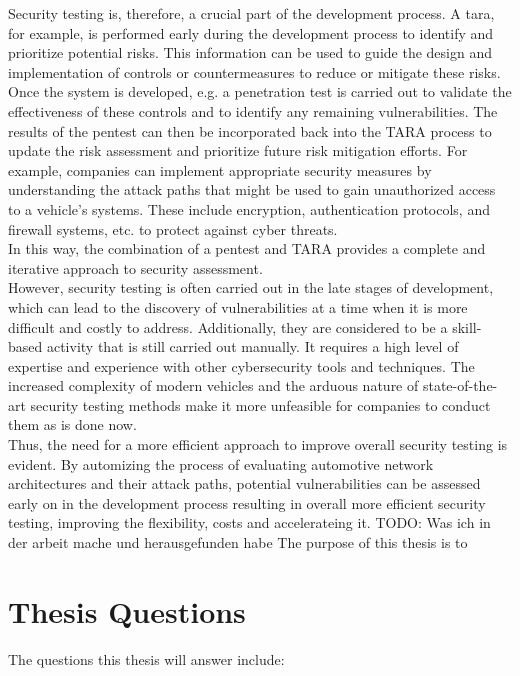 Security testing is, therefore, a crucial part of the development process.
A \gls{tara}, for example, is performed early during the development process to identify and prioritize potential risks.
This information can be used to guide the design and implementation of controls or countermeasures to reduce or mitigate these risks.
Once the system is developed, e.g. a penetration test is carried out to validate the effectiveness of these controls and to identify any remaining vulnerabilities. 
The results of the pentest can then be incorporated back into the TARA process to update the risk assessment and prioritize future risk mitigation efforts. 
For example, companies can implement appropriate security measures by understanding the attack paths that might be used to gain unauthorized access to a vehicle's systems. 
These include encryption, authentication protocols, and firewall systems, etc. to protect against cyber threats.\\
In this way, the combination of a pentest and TARA provides a complete and iterative approach to security assessment.\\
However, security testing is often carried out in the late stages of development, which can lead to the discovery of vulnerabilities at a time when it is more difficult and costly to address.
Additionally, they are considered to be a skill-based activity that is still carried out manually.
It requires a high level of expertise and experience with other cybersecurity tools and techniques. 
The increased complexity of modern vehicles and the arduous nature of state-of-the-art security testing methods make it more unfeasible for companies to conduct them as is done now.\\
Thus, the need for a more efficient approach to improve overall security testing is evident. 
By automizing the process of evaluating automotive network architectures and their attack paths, 
potential vulnerabilities can be assessed early on in the development process resulting in overall more efficient security testing, improving the flexibility, costs and accelerateing it.
TODO: Was ich in der arbeit mache und herausgefunden habe
The purpose of this thesis is to 

\section{Thesis Questions}
\label{sec:thesis-questions}

The questions this thesis will answer include:

